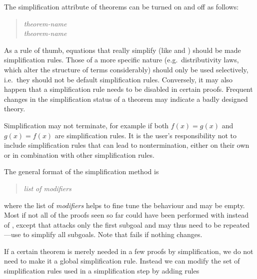 \begin{isabellebody}
\begin{isamarkuptext}
The simplification attribute of theorems can be turned on and off as follows:
\begin{quote}
 \textit{theorem-name}\\
 \textit{theorem-name}
\end{quote}
As a rule of thumb, equations that really simplify (like  and ) should be made simplification
rules.  Those of a more specific nature (e.g.\ distributivity laws, which
alter the structure of terms considerably) should only be used selectively,
i.e.\ they should not be default simplification rules.  Conversely, it may
also happen that a simplification rule needs to be disabled in certain
proofs.  Frequent changes in the simplification status of a theorem may
indicate a badly designed theory.
\begin{warn}
  Simplification may not terminate, for example if both $f(x) = g(x)$ and
  $g(x) = f(x)$ are simplification rules. It is the user's responsibility not
  to include simplification rules that can lead to nontermination, either on
  their own or in combination with other simplification rules.
\end{warn}%
\end{isamarkuptext}%
%
%
\begin{isamarkuptext}%
The general format of the simplification method is
\begin{quote}
 \textit{list of modifiers}
\end{quote}
where the list of \emph{modifiers} helps to fine tune the behaviour and may
be empty. Most if not all of the proofs seen so far could have been performed
with  instead of , except that  attacks
only the first subgoal and may thus need to be repeated---use
 to simplify all subgoals.
Note that  fails if nothing changes.%
\end{isamarkuptext}%
%
%
\begin{isamarkuptext}%
If a certain theorem is merely needed in a few proofs by simplification,
we do not need to make it a global simplification rule. Instead we can modify
the set of simplification rules used in a simplification step by adding rules

\end{isamarkuptext}
\end{isabellebody}
